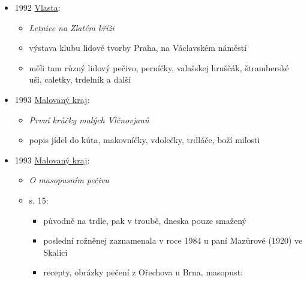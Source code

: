 \begin{itemize}
  \begin{itemize}
  \tightlist
  \item
    s. 11. Ze starých časů. Velikonoční poesie.
  \item
    úryvek z knížky Bohumily Dubňanské (1883-1966) Z našich dějin. Píše
    o vzpomínkách na rodný kraj v okolí Dubňan.
  \item
    každá dědina má svoje mistry, naše dědina má tetičku Nikličku, která
    vyniká mistrným pečením trdelníků
  \end{itemize}
\item
  1992
  \href{https://www.digitalniknihovna.cz/mzk/uuid/uuid:0bf81f80-ef3e-11e6-96c5-5ef3fc9ae867}{Vlasta}:

  \begin{itemize}
  \tightlist
  \item
    \emph{Letnice na Zlatém kříži}
  \item
    výstava klubu lidové tvorby Praha, na Václavském náměstí
  \item
    měli tam různý lidový pečivo, perníčky, valašskej hruščák,
    štramberské uši, caletky, trdelník a další
  \end{itemize}
\item
  1993
  \href{https://ceskadigitalniknihovna.cz/uuid/uuid:788f9b30-023f-11e4-97de-5ef3fc9ae867}{Malovaný
  kraj}:

  \begin{itemize}
  \tightlist
  \item
     \emph{První krůčky malých Vlčnovjanů}
  \item
    popis jídel do kúta, makovníčky, vdolečky, trdláče, boží milosti
  \end{itemize}
\item
  1993
  \href{https://ceskadigitalniknihovna.cz/uuid/uuid:c6a2f3b0-0381-11e4-97de-5ef3fc9ae867}{Malovaný
  kraj}:

  \begin{itemize}
  \tightlist
  \item
     \emph{O masopusním pečivu}
  \item
    s. 15:

    \begin{itemize}
    \tightlist
    \item
      původně na trdle, pak v troubě, dneska pouze smažený
    \item
      poslední rožněnej zaznamenala v roce 1984 u paní Mazůrové (1920)
      ve Skalici
    \item
      recepty, obrázky pečení z Ořechova u Brna, masopust:


\end{itemize}
\end{itemize}
\end{itemize}
